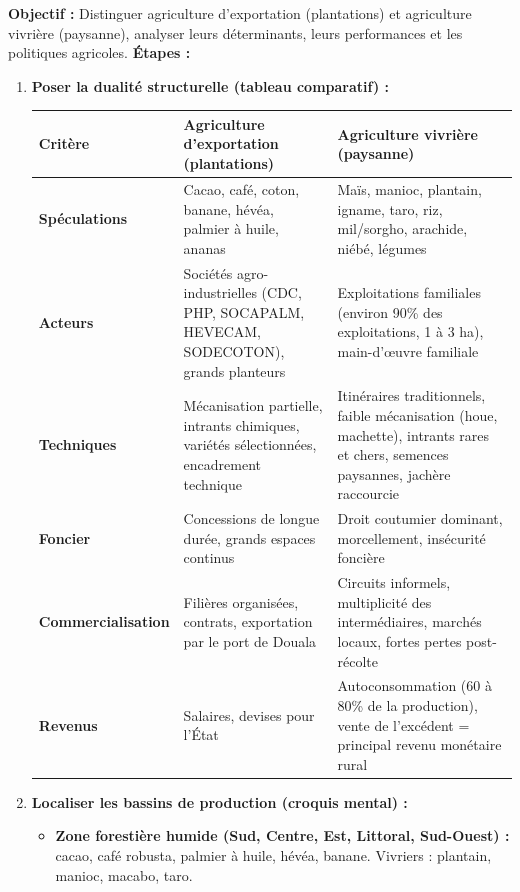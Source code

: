 \documentclass[11pt]{article}
\begin{document}
\begin{methode}
\textbf{Objectif :} Distinguer agriculture d'exportation (plantations) et agriculture vivrière (paysanne), analyser leurs déterminants, leurs performances et les politiques agricoles.
\textbf{Étapes :}
\begin{enumerate}
    \item \textbf{Poser la dualité structurelle (tableau comparatif) :}
    \begin{center}
    \begin{tabularx}{\linewidth}{|l|X|X|}\hline
    \textbf{Critère} & \textbf{Agriculture d'exportation (plantations)} & \textbf{Agriculture vivrière (paysanne)} \\ \hline
    \textbf{Spéculations} & Cacao, café, coton, banane, hévéa, palmier à huile, ananas & Maïs, manioc, plantain, igname, taro, riz, mil/sorgho, arachide, niébé, légumes \\ \hline
    \textbf{Acteurs} & Sociétés agro-industrielles (CDC, PHP, SOCAPALM, HEVECAM, SODECOTON), grands planteurs & Exploitations familiales (environ 90\% des exploitations, 1 à 3 ha), main-d'œuvre familiale \\ \hline
    \textbf{Techniques} & Mécanisation partielle, intrants chimiques, variétés sélectionnées, encadrement technique & Itinéraires traditionnels, faible mécanisation (houe, machette), intrants rares et chers, semences paysannes, jachère raccourcie \\ \hline
    \textbf{Foncier} & Concessions de longue durée, grands espaces continus & Droit coutumier dominant, morcellement, insécurité foncière \\ \hline
    \textbf{Commercialisation} & Filières organisées, contrats, exportation par le port de Douala & Circuits informels, multiplicité des intermédiaires, marchés locaux, fortes pertes post-récolte \\ \hline
    \textbf{Revenus} & Salaires, devises pour l'État & Autoconsommation (60 à 80\% de la production), vente de l'excédent = principal revenu monétaire rural \\ \hline
    \end{tabularx}
    \end{center}
    \item \textbf{Localiser les bassins de production (croquis mental) :}
    \begin{itemize}
        \item \textbf{Zone forestière humide (Sud, Centre, Est, Littoral, Sud-Ouest) :} cacao, café robusta, palmier à huile, hévéa, banane. Vivriers : plantain, manioc, macabo, taro.

\end{itemize}
\end{enumerate}
\end{methode}
\end{document}
